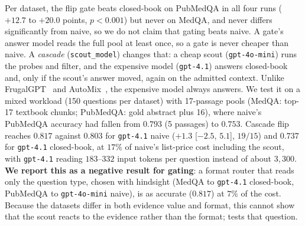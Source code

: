 \documentclass[11pt]{article}
\begin{document}
Per dataset, the flip gate beats closed-book on PubMedQA in all four runs
($+12.7$ to $+20.0$ points, $p{<}0.001$) but never on MedQA, and never differs
significantly from naive, so we do not claim that gating beats naive. A gate's answer model reads the full pool at least once, so a gate is never
cheaper than naive. A
\emph{cascade} (\texttt{scout\_model}) changes that: a cheap scout
(\texttt{gpt-4o-mini}) runs the probes and filter, and the expensive model
(\texttt{gpt-4.1}) answers closed-book and, only if the scout's answer moved,
again on the admitted context. Unlike FrugalGPT~\citep{frugalgpt} and
AutoMix~\citep{automix}, the expensive model always answers. We test it on a
mixed workload (150 questions per dataset) with 17-passage pools (MedQA: top-17 textbook
chunks; PubMedQA: gold abstract plus 16), where naive's PubMedQA accuracy had
fallen from $0.793$ (5 passages) to $0.753$. Cascade flip reaches $0.817$ against
$0.803$ for \texttt{gpt-4.1} naive ($+1.3$ [$-2.5$, $5.1$], $19/15$) and
$0.737$ for \texttt{gpt-4.1} closed-book, at $17\%$ of naive's list-price cost
including the scout, with \texttt{gpt-4.1} reading $183$--$332$ input tokens per question
instead of about $3{,}300$. \textbf{We report this as a negative result for
gating}: a format router that reads only the question type, chosen with
hindsight (MedQA to \texttt{gpt-4.1} closed-book, PubMedQA to
\texttt{gpt-4o-mini} naive), is as accurate ($0.817$) at $7\%$ of the cost. Because the datasets differ in
both evidence value and format, this cannot show that the scout reacts to the
evidence rather than the format; \citet{influence} tests that question.

\end{document}
